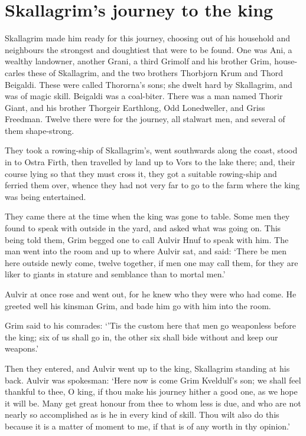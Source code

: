 \chapter{Skallagrim's journey to the king}
Skallagrim made him ready for this journey, choosing out of his household and neighbours the strongest and doughtiest that were to be found. One was Ani, a wealthy landowner, another Grani, a third Grimolf and his brother Grim, house-carles these of Skallagrim, and the two brothers Thorbjorn Krum and Thord Beigaldi. These were called Thororna's sons; she dwelt hard by Skallagrim, and was of magic skill. Beigaldi was a coal-biter. There was a man named Thorir Giant, and his brother Thorgeir Earthlong, Odd Lonedweller, and Griss Freedman. Twelve there were for the journey, all stalwart men, and several of them shape-strong.

They took a rowing-ship of Skallagrim's, went southwards along the coast, stood in to Ostra Firth, then travelled by land up to Vors to the lake there; and, their course lying so that they must cross it, they got a suitable rowing-ship and ferried them over, whence they had not very far to go to the farm where the king was being entertained.

They came there at the time when the king was gone to table. Some men they found to speak with outside in the yard, and asked what was going on. This being told them, Grim begged one to call Aulvir Hnuf to speak with him. The man went into the room and up to where Aulvir sat, and said: `There be men here outside newly come, twelve together, if men one may call them, for they are liker to giants in stature and semblance than to mortal men.'

Aulvir at once rose and went out, for he knew who they were who had come. He greeted well his kinsman Grim, and bade him go with him into the room.

Grim said to his comrades: `'Tis the custom here that men go weaponless before the king; six of us shall go in, the other six shall bide without and keep our weapons.'

Then they entered, and Aulvir went up to the king, Skallagrim standing at his back. Aulvir was spokesman: `Here now is come Grim Kveldulf's son; we shall feel thankful to thee, O king, if thou make his journey hither a good one, as we hope it will be. Many get great honour from thee to whom less is due, and who are not nearly so accomplished as is he in every kind of skill. Thou wilt also do this because it is a matter of moment to me, if that is of any worth in thy opinion.'

